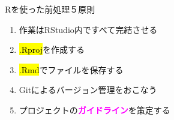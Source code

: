 \documentclass[ignorenonframetext,]{beamer}
\begin{document}
\begin{frame}{\faBullhorn Rを使った前処理５原則}

\begin{enumerate}
\def\labelenumi{\arabic{enumi}.}
\itemsep1pt\parskip0pt
\item
  作業はRStudio内ですべて完結させる
\item
  \hl{.Rproj}を作成する
\item
  \hl{.Rmd}でファイルを保存する
\item
  Gitによるバージョン管理をおこなう
\item
  プロジェクトの\textbf{\textcolor{magenta}{ガイドライン}}を策定する
\end{enumerate}

\end{frame}
\end{document}
